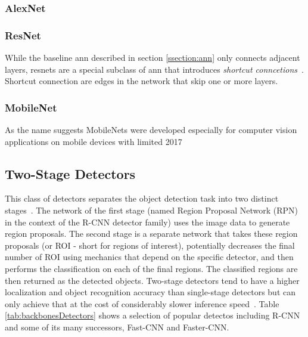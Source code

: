 \documentclass[
			   fontsize=11pt,
               paper=a4,
               bibliography=totoc,
               idxtotoc,
               headsepline,
               footsepline,
               footinclude=false,
               BCOR=12mm,
               DIV=13,
               openany,   %
               ]
               {scrbook}
\begin{document}
\subsubsection{AlexNet}



\subsubsection{ResNet}

While the baseline \gls{ann} described in section \ref{ssection:ann} only connects adjacent layers, \glspl{resnet} are a special subclass of \gls{ann} that introduces \textit{shortcut conncetions}~\cite{backboneResNet}. Shortcut connection are edges in the network that skip one or more layers.

\subsubsection{MobileNet}
As the name suggests MobileNets were developed especially for computer vision applications on mobile devices with limited 
2017


\subsection{Two-Stage Detectors}

This class of detectors separates the object detection task into two distinct stages~\cite{12stageSYNASC2018}. The network of the first stage (named Region Proposal Network (RPN) in the context of the R-CNN detector family) uses the image data to generate region proposals. The second stage is a separate network that takes these region proposals (or ROI - short for regions of interest), potentially decreases the final number of ROI using mechanics that depend on the specific detector, and then performs the classification on each of the final regions. The classified regions are then returned as the detected objects. Two-stage detectors tend to have a higher localization and object recognition accuracy than single-stage detectors but can only achieve that at the cost of considerably slower inference speed~\cite{surveyICBDT2019}. Table \ref{tab:backbonesDetectors} shows a selection of popular detectos including R-CNN and some of its many successors, Fast-CNN and Faster-CNN.
\end{document}
